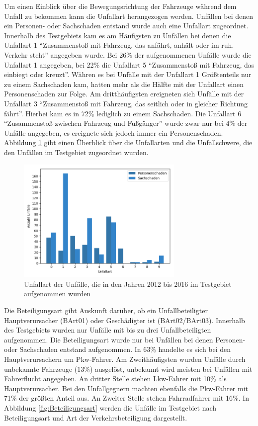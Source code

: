Um einen Einblick über die Bewegungsrichtung der Fahrzeuge während dem Unfall zu bekommen kann die Unfallart herangezogen werden. Unfällen bei denen ein Personen- oder Sachschaden entstand wurde auch eine Unfallart zugeordnet. Innerhalb des Testgebiets kam es am Häufigsten zu Unfällen bei denen die Unfallart 1 \enquote{Zusammenstoß mit Fahrzeug, das anfährt, anhält oder im ruh. Verkehr steht} angegeben wurde. Bei 26\% der aufgenommenen Unfälle wurde die Unfallart 1 angegeben, bei 22\% die Unfallart 5 \enquote{Zusammenstoß mit Fahrzeug, das einbiegt oder kreuzt}. Währen es bei Unfälle mit der Unfallart 1 Größtenteils nur zu einem Sachschaden kam, hatten mehr als die Hälfte mit der Unfallart einen Personenschaden zur Folge. Am dritthäufigsten ereigneten sich Unfälle mit der Unfallart 3 \enquote{Zusammenstoß mit Fahrzeug, das seitlich oder in gleicher Richtung fährt}. Hierbei kam es in 72\% lediglich zu einem Sachschaden. Die Unfallart 6 \enquote{Zusammenstoß zwischen Fahrzeug und Fußgänger} wurde zwar nur bei 4\% der Unfälle angegeben, es ereignete sich jedoch immer ein Personenschaden. Abbildung \ref{fig:Unfallart} gibt einen Überblick über die Unfallarten und die Unfallschwere, die den Unfällen im Testgebiet zugeordnet wurden.

\begin{savenotes}
	\begin{figure}[H]
		\centering
		\includegraphics[width=8cm,height=6cm]{figures/Unfallart}
		\caption[Unfallart der Unfälle, die in den Jahren 2012 bis 2016 im Testgebiet aufgenommen wurden]{Unfallart der Unfälle, die in den Jahren 2012 bis 2016 im Testgebiet aufgenommen wurden}\label{fig:Unfallart}
	\end{figure}
\end{savenotes}

Die Beteiligungsart gibt Auskunft darüber, ob ein Unfallbeteiligter Hauptverursacher (BArt01) oder Geschädigter ist (BArt02/BArt03). Innerhalb des Testgebiets wurden nur Unfälle mit bis zu drei Unfallbeteiligten aufgenommen. Die Beteiligungsart wurde nur bei Unfällen bei denen Personen- oder Sachschaden entstand aufgenommen. In 63\% handelte es sich bei den Hauptverursachern um Pkw-Fahrer. Am Zweithäufigsten wurden Unfälle durch unbekannte Fahrzeuge (13\%) ausgelöst, unbekannt wird meisten bei Unfällen mit Fahrerflucht angegeben. An dritter Stelle stehen Lkw-Fahrer mit 10\% als Hauptverursacher. Bei den Unfallgegnern machten ebenfalls die Pkw-Fahrer mit 71\% der größten Anteil aus. An Zweiter Stelle stehen Fahrradfahrer mit 16\%. In Abbildung \ref{fig:Beteiligungsart} werden die Unfälle im Testgebiet nach Beteiligungsart und Art der Verkehrsbeteiligung dargestellt. 

